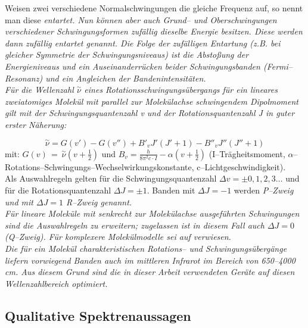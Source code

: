 Weisen zwei verschiedene Normalschwingungen die gleiche Frequenz
auf, so nennt man diese \it entartet\rm . Nun können aber auch
Grund-- und Oberschwingungen verschiedener Schwingungsformen
zufällig dieselbe Energie besitzen. Diese werden dann \it zufällig
entartet \rm genannt. Die Folge der zufälligen Entartung (z.B. bei
gleicher Symmetrie der Schwingungsniveaus) ist die Absto{\ss}ung der
Energieniveaus und ein Auseinanderrücken beider Schwingungsbanden
(\it Fermi--Resonanz\rm ) und ein Angleichen der
Bandenintensitäten.\\

Für die Wellenzahl $\stackrel{\sim}{\nu}$ eines
Rotationsschwingungsübergangs für ein lineares zweiatomiges
Molekül mit parallel zur Molekülachse schwingendem Dipolmoment
gilt mit der Schwingungsquantenzahl v und der Rotationsquantenzahl
J in guter erster Näherung:

\begin{equation}\label{eqnu}
  \stackrel{\sim}{\nu} = G(v')-G(v'')+B'_vJ'(J'+1)-B''_vJ''(J''+1)
\end{equation}
mit: $G(v)\,=\,\stackrel{\sim}{\nu}(v+\frac{1}{2})$ und
$B_v=\frac{h}{8\pi^{2}c \cdot I}-\alpha(v+\frac{1}{2})$
(I--Trägheitsmoment,
$\alpha$--Rotations--Schwingungs--Wechselwirkungskonstante,
c--Lichtgeschwindigkeit).\\

Als Auswahlregeln gelten für die Schwingungsquantenzahl $\Delta v
= \pm 0,1,2,3 \ldots$ und für die Rotationsquantenzahl $\Delta
J=\pm 1$. Banden mit $\Delta J=-1$ werden \it P--Zweig \rm und mit
$\Delta J=1$ \it R--Zweig \rm genannt.\\

Für lineare Moleküle mit senkrecht zur Molekülachse ausgeführten
Schwingungen sind die Auswahlregeln zu erweitern; zugelassen ist
in diesem Fall auch $\Delta J=0$ (\it Q--Zweig\rm ). Für
komplexere Molekülmodelle sei auf \cite{hollas92} verwiesen.\\

Die für ein Molekül charakteristischen Rotations-- und
Schwingungsübergänge liefern vorwiegend Banden auch im mittleren
Infrarot im Bereich von 650--4000 cm. Aus diesem Grund sind
die in dieser Arbeit verwendeten Geräte auf diesen
Wellenzahlbereich optimiert.\\


\subsection{\label{qualitativ}Qualitative Spektrenaussagen}

